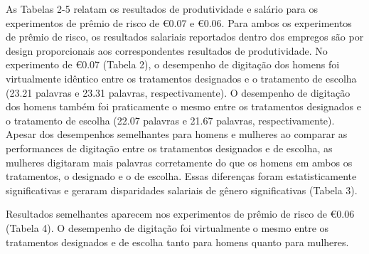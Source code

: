\documentclass[a4paper,12pt]{article}[abntex2]
\begin{document}
As Tabelas 2-5 relatam os resultados de produtividade e salário para os experimentos de prêmio de risco de €0.07 e €0.06. Para ambos os experimentos de prêmio de risco, os resultados salariais reportados dentro dos empregos são por design proporcionais aos correspondentes resultados de produtividade. No experimento de €0.07 (Tabela 2), o desempenho de digitação dos homens foi virtualmente idêntico entre os tratamentos designados e o tratamento de escolha (23.21 palavras e 23.31 palavras, respectivamente). O desempenho de digitação dos homens também foi praticamente o mesmo entre os tratamentos designados e o tratamento de escolha (22.07 palavras e 21.67 palavras, respectivamente). Apesar dos desempenhos semelhantes para homens e mulheres ao comparar as performances de digitação entre os tratamentos designados e de escolha, as mulheres digitaram mais palavras corretamente do que os homens em ambos os tratamentos, o designado e o de escolha. Essas diferenças foram estatisticamente significativas e geraram disparidades salariais de gênero significativas (Tabela 3).

Resultados semelhantes aparecem nos experimentos de prêmio de risco de €0.06 (Tabela 4). O desempenho de digitação foi virtualmente o mesmo entre os tratamentos designados e de escolha tanto para homens quanto para mulheres.

\begin{table}[h!]
\centering
\caption{Produtividade (Número de palavras digitadas corretamente): Prêmio de Risco = 0.07.}
\end{table}
\end{document}
